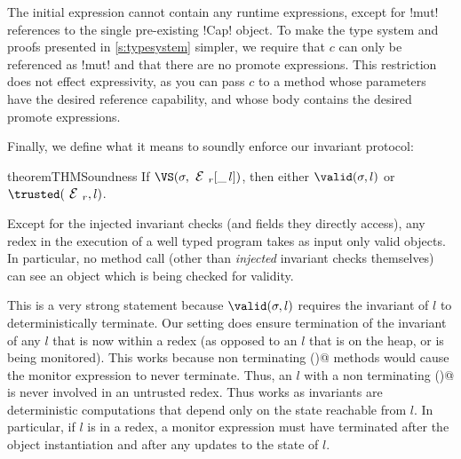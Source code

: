 The initial expression cannot contain any runtime expressions, except for \Q!mut! references to the single pre-existing \Q!Cap! object.
To make the type system and proofs presented in \ref{s:typesystem} simpler, we require that $c$ can only be referenced as \Q!mut! and that there are no promote expressions. This restriction does not effect expressivity, as you can pass $c$ to a method whose parameters have the desired reference capability, and whose body contains the desired promote expressions.

Finally, we define what it means to soundly enforce our invariant protocol:
\SS\begin{restatable}[Soundness]{theorem}{THMSoundness} %
If $\VS(\s, \ER[\_\,l])$, then either $\valid(\s,l)$ or $\trusted(\ER,l)$.
\end{restatable}
Except for the injected invariant checks (and fields they directly access),
any redex in the execution of a well typed program takes as input only valid objects.
In particular, no method call (other than \emph{injected} invariant checks themselves) can see an object which is being checked for validity.

This is a very strong statement because $\valid(\s,l)$ requires
the invariant of $l$ to deterministically terminate.
Our setting does ensure termination of the invariant of any $l$ that is now within a redex (as opposed to an $l$ that is on the heap, or is being monitored).
This works because non terminating \Q@invariant()@ methods would cause the monitor expression to never terminate. Thus, an
$l$ with a non terminating \Q@invariant()@ is never involved in an untrusted redex.
Thus works as invariants are deterministic computations that depend only on the state reachable from $l$.
In particular, if $l$ is in a redex, a monitor expression must have terminated after the object instantiation
and after any updates to the state of $l$.


\lstset{language=FortyThree} %